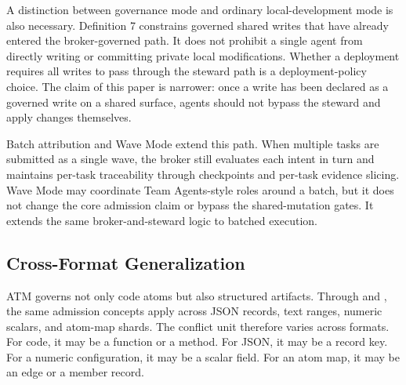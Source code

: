 \documentclass[9pt,letterpaper]{extarticle}
\begin{document}
A distinction between governance mode and ordinary local-development mode is also necessary. Definition 7 constrains governed shared writes that have already entered the broker-governed path. It does not prohibit a single agent from directly writing or committing private local modifications. Whether a deployment requires all writes to pass through the steward path is a deployment-policy choice. The claim of this paper is narrower: once a write has been declared as a governed write on a shared surface, agents should not bypass the steward and apply changes themselves.

Batch attribution and Wave Mode extend this path. When multiple tasks are submitted as a single wave, the broker still evaluates each intent in turn and maintains per-task traceability through checkpoints and per-task evidence slicing. Wave Mode may coordinate Team Agents-style roles around a batch, but it does not change the core admission claim or bypass the shared-mutation gates. It extends the same broker-and-steward logic to batched execution.

\subsection{Cross-Format Generalization}

ATM governs not only code atoms but also structured artifacts. Through \texttt{} and \texttt{}, the same admission concepts apply across JSON records, text ranges, numeric scalars, and atom-map shards. The conflict unit therefore varies across formats. For code, it may be a function or a method. For JSON, it may be a record key. For a numeric configuration, it may be a scalar field. For an atom map, it may be an edge or a member record.
\end{document}
